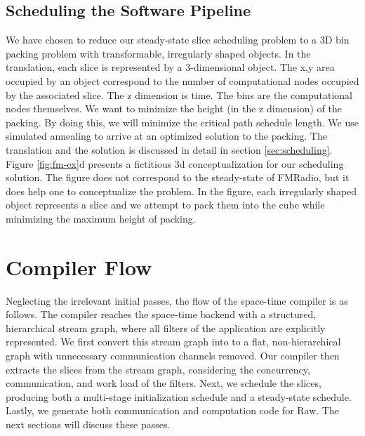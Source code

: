 \subsection{Scheduling the Software Pipeline}
We have chosen to reduce our steady-state slice scheduling problem to
a 3D bin packing problem \cite{binpacking} with transformable,
irregularly shaped objects.  In the translation, each slice is
represented by a 3-dimensional object.  The x,y area occupied by an
object correspond to the number of computational nodes occupied by the
associated slice. The z dimension is time.  The bins are the
computational nodes themselves.  We want to minimize the height (in
the z dimension) of the packing.  By doing this, we will minimize the
critical path schedule length.  We use simulated annealing to arrive
at an optimized solution to the packing.  The translation and the
solution is discussed in detail in section
\ref{sec:scheduling}. Figure
\ref{fig:fm-ex}d presents a fictitious 3d conceptualization for
our scheduling solution.  The figure does not correspond to the
steady-state of FMRadio, but it does help one to conceptualize the
problem. In the figure, each irregularly shaped object represents a
slice and we attempt to pack them into the cube while minimizing the
maximum height of packing.

\section{Compiler Flow}
Neglecting the irrelevant initial passes, the flow of the space-time
compiler is as follows.  The compiler reaches the space-time backend
with a structured, hierarchical stream graph, where all filters of the
application are explicitly represented.  We first convert this stream
graph into to a flat, non-hierarchical graph with unnecessary
communication channels removed.  Our compiler then extracts the
slices from the stream graph, considering the concurrency,
communication, and work load of the filters.
Next, we schedule the slices, producing both a multi-stage
initialization schedule and a steady-state schedule.  Lastly, we
generate both communication and computation code for Raw.  The next
sections will discuss these passes.